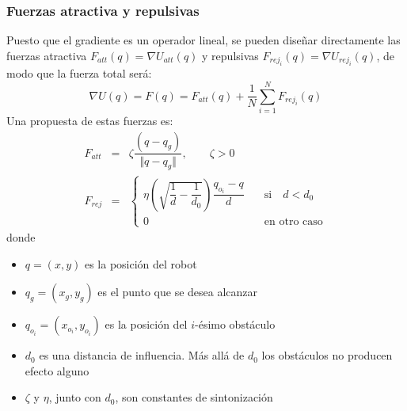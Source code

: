 \begin{frame}\frametitle{Fuerzas atractiva y repulsivas}
  Puesto que el gradiente es un operador lineal, se pueden diseñar directamente las fuerzas atractiva $F_{att}(q) = \nabla U_{att}(q)$ y repulsivas $F_{rej_i}(q) = \nabla U_{rej_i}(q)$, de modo que la fuerza total será:
  \[ \nabla U(q) = F(q) = F_{att}(q) + \frac{1}{N}\sum_{i=1}^N F_{rej_i}(q)\]
  Una propuesta de estas fuerzas es:
  \begin{eqnarray*}
    \label{eq:attractive}
    F_{att} &=& \zeta \dfrac{\left(q - q_g\right) }{\Vert q - q_g \Vert},\qquad \zeta > 0\label{eq:PotFieldsAttraction}\\
    F_{rej} &=& \begin{cases}
                  \eta\left(\sqrt{\dfrac{1}{d} - \dfrac{1}{d_0}}\right)\dfrac{q_{o_i} - q}{d}
                  & \quad\textrm{si}\quad d < d_0\\
                  0 & \quad\textrm{en otro caso}
                \end{cases}
  \end{eqnarray*}
  donde
  \begin{itemize}
  \item $q=(x,y)$ es la posición del robot
  \item $q_g=(x_g, y_g)$ es el punto que se desea alcanzar
  \item $q_{o_i} = (x_{o_i}, y_{o_i})$ es la posición del $i$-ésimo obstáculo
  \item $d_0$ es una distancia de influencia. Más allá de $d_0$ los obstáculos no producen efecto alguno
  \item $\zeta$ y $\eta$, junto con $d_0$, son constantes de sintonización
  \end{itemize}
\end{frame}


